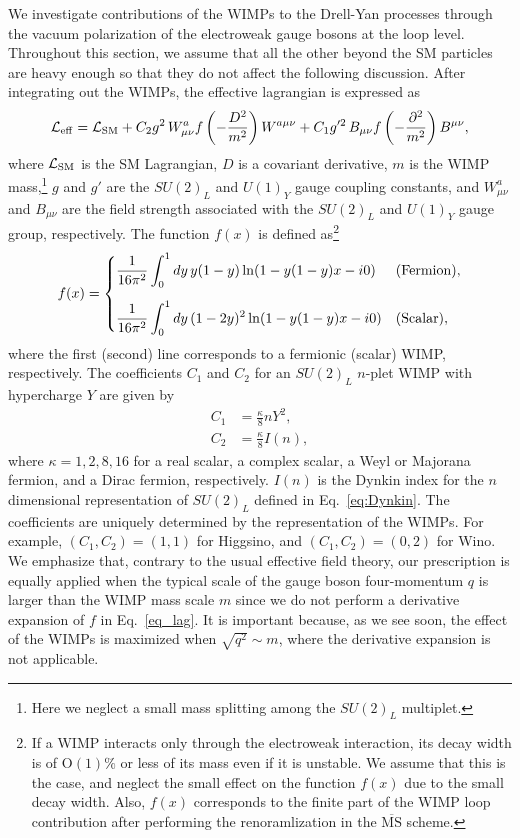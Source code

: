 \documentclass[12pt,twoside,book]{article}
\begin{document}
We investigate contributions of the WIMPs to the Drell-Yan processes through the vacuum polarization of the electroweak gauge bosons at the loop level.
Throughout this section, we assume that all the other beyond the SM particles are heavy enough so that they do not affect the following discussion.
After integrating out the WIMPs, the effective lagrangian is expressed as
\begin{align}
 \mathcal{L}_{\rm eff} = \mathcal{L}_{\rm SM} + C_2 g^2\, W_{\mu \nu}^a
 f\left(-\frac{D^2}{m^2}\right) W^{a\mu\nu} + C_1 g'^2\, B_{\mu\nu}
 f\left(-\frac{\partial^2}{m^2}\right) B^{\mu\nu},\label{eq_lag}
\end{align}
where $\mathcal{L}_{\rm SM}$ is the SM Lagrangian, $D$ is a covariant derivative, $m$ is the WIMP mass,\footnote
{
  Here we neglect a small mass splitting among the $SU(2)_L$ multiplet.
}
$g$ and $g'$ are the $SU(2)_L$ and $U(1)_Y$ gauge coupling constants, and $W_{\mu\nu}^a$ and $B_{\mu\nu}$ are the field strength associated with the $SU(2)_L$ and $U(1)_Y$ gauge group, respectively.
The function $f(x)$ is defined as\footnote
{
  If a WIMP interacts only through the electroweak interaction, its decay width is of $\mathrm{O}(1)\%$ or less of its mass even if it is unstable.
  We assume that this is the case, and neglect the small effect on the function $f(x)$ due to the small decay width.
  Also, $f(x)$ corresponds to the finite part of the WIMP loop contribution after performing the renoramlization in the $\overline{\mathrm{MS}}$ scheme.
}
\begin{align}
 f(x) = \begin{cases}
	 \displaystyle{\frac{1}{16\pi^2} \int_0^1 dy\, y(1-y) \ln (1 -
	 y(1-y)x - i0)} & {\rm (Fermion)},\\[5mm]
	 \displaystyle{\frac{1}{16\pi^2} \int_0^1 dy\, (1-2y)^2 \ln (1-
	 y(1-y)x - i0)} & {\rm (Scalar)},
	\end{cases}\label{eq_f}
\end{align}
where the first (second) line corresponds to a fermionic (scalar) WIMP, respectively.
The coefficients $C_1$ and $C_2$ for an $SU(2)_L$ $n$-plet WIMP with hypercharge $Y$ are given by
\begin{align}
 C_1 &= \frac{\kappa}{8} n Y^2,\label{eq_C1}\\
 C_2 &= \frac{\kappa}{8} I(n),\label{eq_C2}
\end{align}
where $\kappa = 1, 2, 8, 16$ for a real scalar, a complex scalar, a Weyl or Majorana fermion, and a Dirac fermion, respectively.
$I(n)$ is the Dynkin index for the $n$ dimensional representation of $SU(2)_L$ defined in Eq.~\eqref{eq:Dynkin}.
The coefficients are uniquely determined by the representation of the WIMPs.
For example, $(C_1, C_2) = (1, 1)$ for Higgsino, and $(C_1, C_2) = (0, 2)$ for Wino.
We emphasize that, contrary to the usual effective field theory, our prescription is equally applied when the typical scale of the gauge boson four-momentum $q$ is larger than the WIMP mass scale $m$ since we do not perform a derivative expansion of $f$ in
Eq.~\eqref{eq_lag}.
It is important because, as we see soon, the effect of the WIMPs is maximized when $\sqrt{q^2}\sim m$, where the derivative expansion is not applicable.
\end{document}
